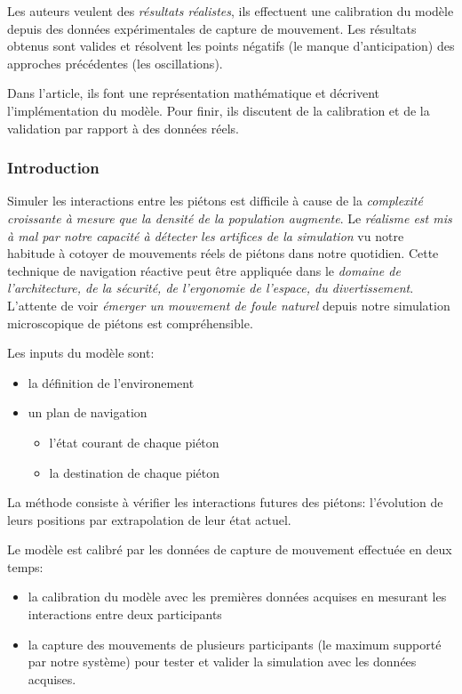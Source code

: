 \documentclass[11pt]{report}
\begin{document}
Les auteurs veulent des \textit{résultats réalistes}, ils effectuent une calibration du modèle depuis des données expérimentales de capture de mouvement. Les résultats obtenus sont valides et résolvent les points négatifs (le manque d'anticipation) des approches précédentes (les oscillations).

Dans l'article, ils font une représentation mathématique et décrivent l'implémentation du modèle. Pour finir, ils discutent de la calibration et de la validation par rapport à des données réels.

\subsubsection{Introduction}

Simuler les interactions entre les piétons est difficile à cause de la \textit{complexité croissante à mesure que la densité de la population augmente}. Le \textit{réalisme est mis à mal par notre capacité à détecter les artifices de la simulation} vu notre habitude à cotoyer de mouvements réels de piétons dans notre quotidien.
Cette technique de navigation réactive peut être appliquée dans le \textit{domaine de l'architecture, de la sécurité, de l'ergonomie de l'espace, du divertissement}.
L'attente de voir \textit{émerger un mouvement de foule naturel} depuis notre simulation microscopique de piétons est compréhensible. 

Les inputs du modèle sont:
\begin{itemize}
	\item la définition de l'environement
	\item un plan de navigation
		\begin{itemize}
			\item l'état courant de chaque piéton
			\item la destination de chaque piéton\newline
		\end{itemize}
\end{itemize}

La méthode consiste à vérifier les interactions futures des piétons: l'évolution de leurs positions par extrapolation de leur état actuel.

Le modèle est calibré par les données de capture de mouvement effectuée en deux temps:
\begin{itemize}
\item la calibration du modèle avec les premières données acquises en mesurant les interactions entre deux participants
\item la capture des mouvements de plusieurs participants (le maximum supporté par notre système) pour tester et valider la simulation avec les données acquises.\newline
\end{itemize}
\end{document}
